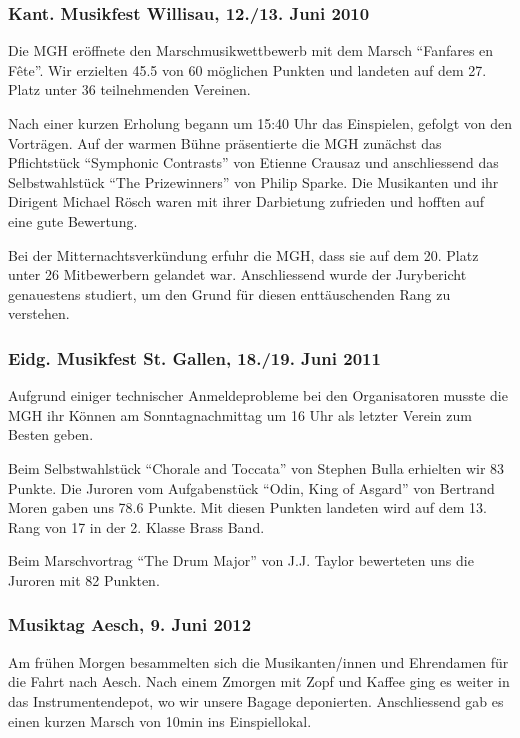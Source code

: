 \begin{history}
    \subsubsection*{Kant. Musikfest Willisau, 12./13. Juni 2010}

    Die MGH eröffnete den Marschmusikwettbewerb mit dem Marsch \enquote{Fanfares
        en Fête}. Wir erzielten 45.5 von 60 möglichen Punkten und landeten auf
    dem 27. Platz unter 36 teilnehmenden Vereinen.

    Nach einer kurzen Erholung begann um 15:40 Uhr das Einspielen, gefolgt von
    den Vorträgen. Auf der warmen Bühne präsentierte die MGH zunächst das
    Pflichtstück \enquote{Symphonic Contrasts} von Etienne Crausaz und
    anschliessend das Selbstwahlstück \enquote{The Prizewinners} von Philip
    Sparke. Die Musikanten und ihr Dirigent Michael Rösch waren mit ihrer
    Darbietung zufrieden und hofften auf eine gute Bewertung.

    Bei der Mitternachtsverkündung erfuhr die MGH, dass sie auf dem 20. Platz
    unter 26 Mitbewerbern gelandet war. Anschliessend wurde der Jurybericht
    genauestens studiert, um den Grund für diesen enttäuschenden Rang zu
    verstehen.

    \subsubsection*{Eidg. Musikfest St. Gallen, 18./19. Juni 2011}

    Aufgrund einiger technischer Anmeldeprobleme bei den Organisatoren musste
    die MGH ihr Können am Sonntagnachmittag um 16 Uhr als letzter Verein zum
    Besten geben.

    Beim Selbstwahlstück \enquote{Chorale and Toccata} von Stephen Bulla
    erhielten wir 83 Punkte. Die Juroren vom Aufgabenstück \enquote{Odin, King
        of Asgard} von Bertrand Moren gaben uns 78.6 Punkte. Mit diesen Punkten
    landeten wird auf dem 13. Rang von 17 in der 2. Klasse Brass Band.

    Beim Marschvortrag \enquote{The Drum Major} von J.J. Taylor bewerteten uns
    die Juroren mit 82 Punkten.


    \subsubsection*{Musiktag Aesch, 9. Juni 2012}

    Am frühen Morgen besammelten sich die Musikanten/innen und Ehrendamen für
    die Fahrt nach Aesch. Nach einem Zmorgen mit Zopf und Kaffee ging es weiter
    in das Instrumentendepot, wo wir unsere Bagage deponierten. Anschliessend
    gab es einen kurzen Marsch von 10min ins Einspiellokal.


\end{history}
